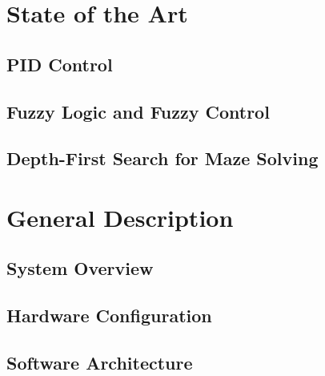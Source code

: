 
\chapter{State of the Art}
\label{ch:state-of-art}

\section{PID Control}
\label{sec:sota-pid}

\section{Fuzzy Logic and Fuzzy Control}
\label{sec:sota-fuzzy}

\section{Depth-First Search for Maze Solving}
\label{sec:sota-dfs}

\chapter{General Description}
\label{ch:general-description}

\section{System Overview}
\label{sec:system-overview}

\section{Hardware Configuration}
\label{sec:hardware}

\section{Software Architecture}
\label{sec:software-arch}

